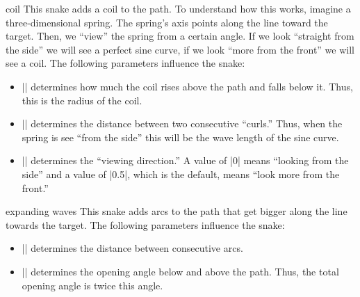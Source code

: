 \begin{snake}{coil}
  This snake adds a coil to the path. To understand how this works,
  imagine a three-dimensional spring. The spring's axis points along
  the line toward the target. Then, we ``view'' the spring from a
  certain angle. If we look ``straight from the side'' we will see a
  perfect sine curve, if we look ``more from the front'' we will see a
  coil. The following parameters influence the snake:  
  \begin{itemize}
  \item |\pgfsnakesegmentamplitude|
    determines how much the coil rises above the path and falls below
    it. Thus, this is the radius of the coil.
  \item |\pgfsnakesegmentlength|
    determines the distance between two consecutive ``curls.'' Thus,
    when the spring is see ``from the side'' this will be the wave
    length of the sine curve. 
  \item |\pgfsnakesegmentaspect|
    determines the ``viewing direction.'' A value of |0| means
    ``looking from the side'' and a value of |0.5|, which is the
    default, means ``look more from the front.'' 
  \end{itemize}
\begin{codeexample}[]
\end{codeexample}
\end{snake}


\begin{snake}{expanding waves}
  This snake adds arcs to the path that get bigger along the line
  towards the target. The following parameters influence the snake:
  \begin{itemize}
  \item |\pgfsnakesegmentlength|
    determines the distance between consecutive arcs.
  \item |\pgfsnakesegmentangle|
    determines the opening angle below and above the path. Thus, the
    total opening angle is twice this angle.
  \end{itemize}
\begin{codeexample}[]
\end{codeexample}
\end{snake}


